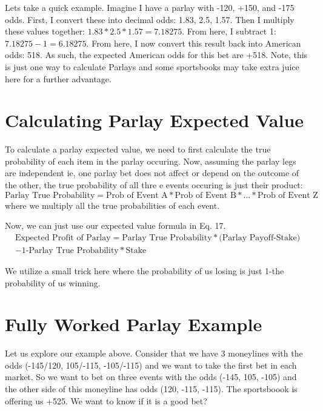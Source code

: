 \documentclass{article}
\begin{document}
Lets take a quick example. Imagine I have a parlay with -120, +150, and -175 odds. First, I convert these into decimal odds: 1.83, 2.5, 1.57. Then I multiply these values together: $1.83*2.5*1.57= 7.18275$. From here, I subtract 1: $7.18275-1=6.18275$. From here, I now convert this result back into American odds: 518. As such, the expected American odds for this bet are +518. Note, this is just one way to calculate Parlays and some sportsbooks may take extra juice here for a further advantage. 

\section{Calculating Parlay Expected Value}
To calculate a parlay expected value, we need to first calculate the true probability of each item in the parlay occuring. Now, assuming the parlay legs are independent ie, one parlay bet does not affect or depend on the outcome of the other, the true probability of all thre e events occuring is just their product:
\begin{equation}
  \textrm{Parlay True Probability} = \textrm{Prob of Event A}*\textrm{Prob of Event B}*\dots*\textrm{Prob of Event Z}
\end{equation}
where we multiply all the true probabilities of each event.

Now, we can just use our expected value formula in Eq. 17.
\begin{multline}
  \textrm{Expected Profit of Parlay} = \textrm{Parlay True Probability}*\textrm{(Parlay Payoff-Stake)}  \\ - \textrm{1-Parlay True Probability}*\textrm{Stake}
\end{multline}

We utilize a small trick here where the probability of us losing is just 1-the probability of us winning. 

\section{Fully Worked Parlay Example}
Let us explore our example above. Consider that we have 3 moneylines with the odds (-145/120, 105/-115, -105/-115) and we want to take the first bet in each market. So we want to bet on three events with the odds (-145, 105, -105) and the other side of this moneyline has odds (120, -115, -115). The sportsboook is offering us +525. We want to know if it is a good bet? 
\end{document}
